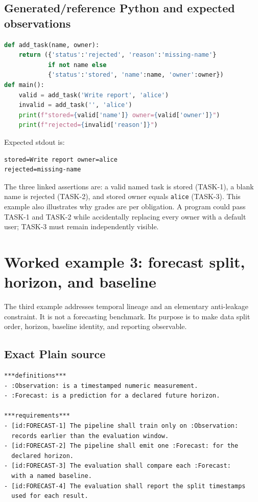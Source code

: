 \documentclass[11pt]{article}
\newcommand{\code}[1]{\texttt{#1}}
\begin{document}
\subsection{Generated/reference Python and expected observations}

\begin{lstlisting}[language=Python]
def add_task(name, owner):
    return ({'status':'rejected', 'reason':'missing-name'}
            if not name else
            {'status':'stored', 'name':name, 'owner':owner})
def main():
    valid = add_task('Write report', 'alice')
    invalid = add_task('', 'alice')
    print(f"stored={valid['name']} owner={valid['owner']}")
    print(f"rejected={invalid['reason']}")
\end{lstlisting}

Expected stdout is:

\begin{lstlisting}[language={}]
stored=Write report owner=alice
rejected=missing-name
\end{lstlisting}

The three linked assertions are: a valid named task is stored (TASK-1), a
blank name is rejected (TASK-2), and stored owner equals \code{alice}
(TASK-3).  This example also illustrates why grades are per obligation.  A
program could pass TASK-1 and TASK-2 while accidentally replacing every owner
with a default user; TASK-3 must remain independently visible.

\section{Worked example 3: forecast split, horizon, and baseline}

The third example addresses temporal lineage and an elementary anti-leakage
constraint.  It is not a forecasting benchmark.  Its purpose is to make data
split order, horizon, baseline identity, and reporting observable.

\subsection{Exact Plain source}

\begin{lstlisting}[language={}]
***definitions***
- :Observation: is a timestamped numeric measurement.
- :Forecast: is a prediction for a declared future horizon.

***requirements***
- [id:FORECAST-1] The pipeline shall train only on :Observation:
  records earlier than the evaluation window.
- [id:FORECAST-2] The pipeline shall emit one :Forecast: for the
  declared horizon.
- [id:FORECAST-3] The evaluation shall compare each :Forecast:
  with a named baseline.
- [id:FORECAST-4] The evaluation shall report the split timestamps
  used for each result.
\end{lstlisting}
\end{document}
